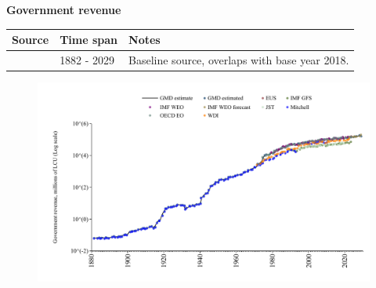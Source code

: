 \documentclass[12pt,a4paper,landscape]{article}
\begin{document}
\begin{adjustbox}{max totalsize={\paperwidth}{\paperheight},center}
\begin{minipage}[t][\textheight][t]{\textwidth}
\vspace*{0.5cm}
{}
\begin{center}
{\Large\bfseries Government revenue}
\end{center}
\vspace{0.5cm}
\begin{table}[H]
\centering
\small
\begin{tabular}{|l|l|l|}
\hline
\textbf{Source} & \textbf{Time span} & \textbf{Notes} \\
\hline
\rowcolor{white}\cite{GMD_estimated}& 1882 - 2029 &Baseline source, overlaps with base year 2018. \\
\hline
\end{tabular}
\end{table}
\begin{figure}[H]
\centering
\includegraphics[width=\textwidth,height=0.6\textheight,keepaspectratio]{graphs/FIN_govrev.pdf}
\end{figure}
\end{minipage}
\end{adjustbox}
\end{document}
